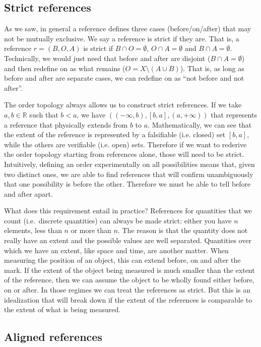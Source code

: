 \documentclass[12pt]{iopart}
\begin{document}
\subsection{Strict references}

As we saw, in general a reference defines three cases (before/on/after) that may not be mutually exclusive. We say a reference is strict if they are. That is, a reference $r= (B, O, A)$ is strict if $B \cap O = \emptyset$, $O \cap A = \emptyset$ and $B \cap A = \emptyset$. Technically, we would just need that before and after are disjoint ($B \cap A = \emptyset$) and then redefine on as what remains ($O = X \setminus (A \cup B)$). That is, as long as before and after are separate cases, we can redefine on as ``not before and not after''.

The order topology always allows us to construct strict references. If we take $a,b \in \mathbb{R}$ such that $b<a$, we have $( (-\infty, b), [b, a], (a, +\infty) )$ that represents a reference that physically extends from $b$ to $a$. Mathematically, we can see that the extent of the reference is represented by a falsifiable (i.e. closed) set $[b,a]$, while the others are verifiable (i.e. open) sets. Therefore if we want to rederive the order topology starting from references alone, those will need to be strict. Intuitively, defining an order experimentally on all possibilities means that, given two distinct ones, we are able to find references that will confirm unambiguously that one possibility is before the other. Therefore we must be able to tell before and after apart.

What does this requirement entail in practice? References for quantities that we count (i.e.~discrete quantities) can always be made strict: either you have $n$ elements, less than $n$ or more than $n$. The reason is that the quantity does not really have an extent and the possible values are well separated. Quantities over which we have an extent, like space and time, are another matter. When measuring the position of an object, this can extend before, on and after the mark. If the extent of the object being measured is much smaller than the extent of the reference, then we can assume the object to be wholly found either before, on or after. In those regimes we can treat the references as strict. But this is an idealization that will break down if the extent of the references is comparable to the extent of what is being measured.

\subsection{Aligned references}
\end{document}
